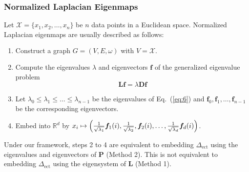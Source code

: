 \documentclass[professionalfonts, hyperref={pdfpagelabels=false,
  colorlinks=true, linkcolor=purple}]{beamer}
\begin{document}
\begin{frame}
  \frametitle{Normalized Laplacian Eigenmaps}
  Let $\mathcal{X} = \{x_1,x_2,\dots,x_n\}$ be $n$ data points in a
  Euclidean space. Normalized Laplacian eigenmaps are usually described
  as follows: \vskip10pt
  \begin{enumerate}
  \item Construct a graph $G = (V,E,\omega)$ with $V = \mathcal{X}$.
  \item Compute the eigenvalues $\lambda$ and eigenvectors
    $\bm{f}$ of the generalized eigenvalue problem
    \begin{equation}
      \label{eq:6}
      \bm{Lf} = \lambda \bm{Df}
    \end{equation}
  \item Let $\lambda_0 \leq \lambda_1 \leq \dots \leq \lambda_{n-1}$ be
    the eigenvalues of Eq.~(\ref{eq:6}) and $\bm{f}_0, \bm{f}_1,
    \dots, \bm{f}_{n-1}$ be the corresponding eigenvectors. 
  \item Embed into $\mathbb{R}^{d}$ by
      $x_i \mapsto \Bigl(\tfrac{1}{\sqrt{\lambda_1}} \bm{f}_{1}(i),
      \tfrac{1}{\sqrt{\lambda_2}},
      \bm{f}_{2}(i), \dots, \tfrac{1}{\sqrt{\lambda_d}}
      \bm{f}_{d}(i)\Bigr)$.
  \end{enumerate}
  \vskip10pt
  \begin{alertblock}{}
    Under our framework, steps 2 to 4 are equivalent to embedding
    $\Delta_{\mathrm{ect}}$ using the eigenvalues and
    eigenvectors of $\mathbf{P}$ (Method 2). This is \alert{not} equivalent to
    embedding $\Delta_{\mathrm{ect}}$ using the eigensystem of $\mathbf{L}$ (Method 1). 
  \end{alertblock}
\end{frame}
\end{document}
